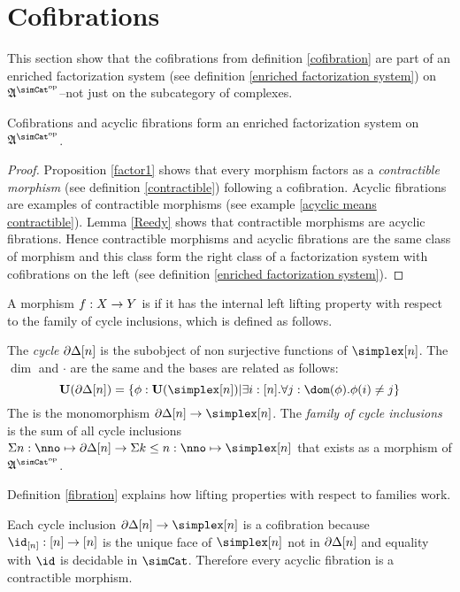 \documentclass[csh.tex]{subfiles}
\begin{document}
\section{Cofibrations}
This section show that the cofibrations from definition \ref{cofibration} are part of an enriched factorization system (see definition \ref{enriched factorization system}) on $\ambient\s$--not just on the subcategory of complexes.

\begin{lemma} Cofibrations and acyclic fibrations form an enriched factorization system on $\ambient\s$. \label{factorization system 1} \end{lemma}

\begin{proof} Proposition \ref{factor1} shows that every morphism factors as a \emph{contractible morphism} (see definition \ref{contractible}) following a cofibration. Acyclic fibrations are examples of contractible morphisms (see example \ref{acyclic means contractible}). Lemma \ref{Reedy} shows that contractible morphisms are acyclic fibrations. Hence contractible morphisms and acyclic fibrations are the same class of morphism and this class form the right class of a factorization system with cofibrations on the left (see definition \ref{enriched factorization system}).
\end{proof}

\begin{definition} A morphism $f: X\to Y$ is  if it has the internal left lifting property with respect to the family of cycle inclusions, which is defined as follows.

The \emph{cycle} $\partial\Delta[n]$ is the subobject of non surjective functions of $\simplex[n]$. The $\dim$ and $\cdot$ are the same and the bases are related as follows:
\[ \base(\cycle[n]) = \set{\phi\of\base(\simplex[n])| \exists i\of[n].\forall j\of \dom(\phi).\phi(i)\neq j } \]
The  is the monomorphism $\cycle[n]\to\simplex[n]$. The \emph{family of cycle inclusions} is the sum of all cycle inclusions $\coproduct{n\of\nno}{\cycle[n]}\to \coproduct{k\leq n\of\nno}{\simplex[n]}$ that exists as a morphism of $\ambient\s$.

Definition \ref{fibration} explains how lifting properties with respect to families work.
\end{definition}

\begin{example} Each cycle inclusion $\cycle[n]\to\simplex[n]$ is a cofibration because $\id_{[n]}\of[n]\to[n]$ is the unique face of $\simplex[n]$ not in $\partial\Delta[n]$ and equality with $\id$ is decidable in $\simCat$. Therefore every acyclic fibration is a contractible morphism. \label{acyclic means contractible}\end{example}
\end{document}
